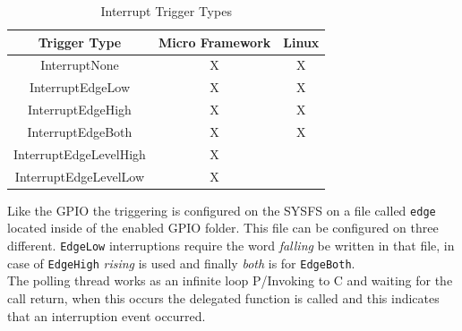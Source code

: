 \begin{table}[htb]
\begin{center}
\begin{tabular}{|c|c|c|}
\hline
{\bf Trigger Type} & {\bf Micro Framework} & {\bf Linux}  \\ \hline \hline
InterruptNone        & X    & X       \\ \hline
InterruptEdgeLow        & X    & X       \\ \hline
InterruptEdgeHigh        & X    & X       \\ \hline
InterruptEdgeBoth        & X    & X       \\ \hline
InterruptEdgeLevelHigh        & X    &        \\ \hline
InterruptEdgeLevelLow        & X    &        \\ \hline
\end{tabular}
\caption{Interrupt Trigger Types}
\label{T:Interrupt-Trigger-Types}
\end{center}
\end{table}

Like the GPIO the triggering is configured on the SYSFS on a file called \verb!edge! located inside of the enabled GPIO folder. This file can be configured on three different. \verb!EdgeLow! interruptions require the word \textit{falling} be written in that file, in case of \verb!EdgeHigh! \textit{rising} is used and finally \textit{both} is for \verb!EdgeBoth!.
\\
The polling thread works as an infinite loop P/Invoking to C and waiting for the call return, when this occurs the delegated function is called and this indicates that an interruption event occurred.


